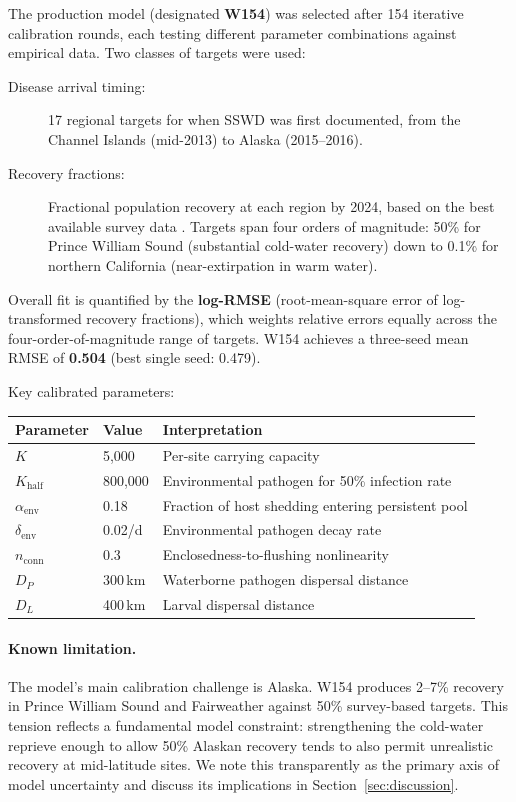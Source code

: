 The production model (designated \textbf{W154}) was selected after 154
iterative calibration rounds, each testing different parameter combinations
against empirical data.  Two classes of targets were used:

\begin{description}
  \item[Disease arrival timing:] 17 regional targets for when SSWD was first
    documented, from the Channel Islands (mid-2013) to Alaska (2015--2016).
  \item[Recovery fractions:] Fractional population recovery at each region by
    2024, based on the best available survey data \citep{gravem2021, gehman2025}.
    Targets span four orders of magnitude: 50\% for Prince William Sound
    (substantial cold-water recovery) down to 0.1\% for northern California
    (near-extirpation in warm water).
\end{description}

Overall fit is quantified by the \textbf{log-RMSE} (root-mean-square error
of log-transformed recovery fractions), which weights relative errors equally
across the four-order-of-magnitude range of targets.  W154 achieves a
three-seed mean RMSE of \textbf{0.504} (best single seed: 0.479).

Key calibrated parameters:
\begin{center}
\small
\begin{tabular}{llp{8cm}}
\toprule
\textbf{Parameter} & \textbf{Value} & \textbf{Interpretation} \\
\midrule
$K$ & 5{,}000 & Per-site carrying capacity \\
$K_\mathrm{half}$ & 800{,}000 & Environmental pathogen for 50\% infection rate \\
$\alpha_\mathrm{env}$ & 0.18 & Fraction of host shedding entering persistent pool \\
$\delta_\mathrm{env}$ & 0.02/d & Environmental pathogen decay rate \\
$n_\mathrm{conn}$ & 0.3 & Enclosedness-to-flushing nonlinearity \\
$D_P$ & 300\,km & Waterborne pathogen dispersal distance \\
$D_L$ & 400\,km & Larval dispersal distance \\
\bottomrule
\end{tabular}
\end{center}

\paragraph{Known limitation.}
The model's main calibration challenge is Alaska.  W154 produces 2--7\%
recovery in Prince William Sound and Fairweather against 50\% survey-based
targets.  This tension reflects a fundamental model constraint:
strengthening the cold-water reprieve enough to allow 50\% Alaskan recovery
tends to also permit unrealistic recovery at mid-latitude sites.  We note
this transparently as the primary axis of model uncertainty and discuss its
implications in Section~\ref{sec:discussion}.

